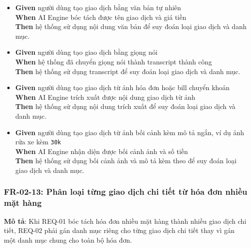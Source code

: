 \begin{itemize}
\item \textbf{Given} người dùng tạo giao dịch bằng văn bản tự nhiên  \\ \hspace*{1.5em}  \textbf{When} AI Engine bóc tách được tên giao dịch và giá tiền  \\ \hspace*{1.5em}  \textbf{Then} hệ thống sử dụng nội dung văn bản để suy đoán loại giao dịch và danh mục.
\item \textbf{Given} người dùng tạo giao dịch bằng giọng nói  \\ \hspace*{1.5em}  \textbf{When} hệ thống đã chuyển giọng nói thành transcript thành công  \\ \hspace*{1.5em}  \textbf{Then} hệ thống sử dụng transcript để suy đoán loại giao dịch và danh mục.
\item \textbf{Given} người dùng tạo giao dịch từ ảnh hóa đơn hoặc bill chuyển khoản  \\ \hspace*{1.5em}  \textbf{When} AI Engine trích xuất được nội dung giao dịch từ ảnh  \\ \hspace*{1.5em}  \textbf{Then} hệ thống sử dụng nội dung trích xuất để suy đoán loại giao dịch và danh mục.
\item \textbf{Given} người dùng tạo giao dịch từ ảnh bối cảnh kèm mô tả ngắn, ví dụ ảnh rửa xe kèm \texttt{30k}  \\ \hspace*{1.5em}  \textbf{When} AI Engine nhận diện được bối cảnh ảnh và số tiền  \\ \hspace*{1.5em}  \textbf{Then} hệ thống sử dụng bối cảnh ảnh và mô tả kèm theo để suy đoán loại giao dịch và danh mục.
\end{itemize}
\subsubsection{FR-02-13: Phân loại từng giao dịch chi tiết từ hóa đơn nhiều mặt hàng}

\textbf{Mô tả}: Khi REQ-01 bóc tách hóa đơn nhiều mặt hàng thành nhiều giao dịch chi tiết, REQ-02 phải gán danh mục riêng cho từng giao dịch chi tiết thay vì gán một danh mục chung cho toàn bộ hóa đơn.



